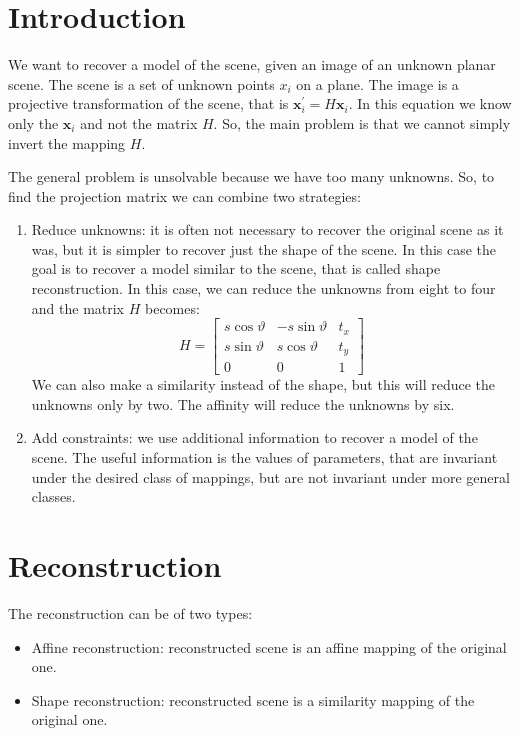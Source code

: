 \documentclass[12pt, a4paper]{report}
\newtheorem[style=M,bodystyle=\normalfont]{theorem}{Theorem}
\newtheorem[style=M,bodystyle=\normalfont]{corollary}{Corollary}
\newtheorem[style=M,bodystyle=\normalfont]{lemma}{Lemma}
\newtheorem[style=M,bodystyle=\normalfont]{definition}{Definition}
\begin{document}
    \section{Introduction}
    We want to recover a model of the scene, given an image of an unknown planar scene. The scene is a set of unknown points $x_i$ on  a 
    plane. The image is a projective transformation of the scene, that is $\boldsymbol{x}_i^{'}=H\boldsymbol{x}_i$. In this equation we
    know only the $\boldsymbol{x}_i$ and not the matrix $H$. So, the main problem is that we cannot simply invert the 
    mapping $H$. 

    The general problem is unsolvable because we have too many unknowns. So, to find the projection matrix we can combine two strategies: 
    \begin{enumerate}
        \item Reduce unknowns: it is often not necessary to recover the original scene as it was, but it is simpler to recover just 
            the shape of the scene. In this case the goal is to recover a model similar to the scene, that is called shape reconstruction. 
            In this case, we can reduce the unknowns from eight to four and the matrix $H$ becomes: 
            \[H=    
            \begin{bmatrix}
                s\cos \vartheta & -s\sin \vartheta & t_x \\
                s\sin \vartheta & s\cos \vartheta & t_y \\
                0 & 0 & 1
            \end{bmatrix}\]
            We can also make a similarity instead of the shape, but this will reduce the unknowns only by two. The affinity will reduce
            the unknowns by six. 
        \item Add constraints: we use additional information to recover a model of the scene. The useful information is the values of
            parameters, that are invariant under the desired class of mappings, but are not invariant under more general classes. 
    \end{enumerate}

    \section{Reconstruction}
    The reconstruction can be of two types: 
    \begin{itemize}
        \item Affine reconstruction: reconstructed scene is an affine mapping of the original one. 
        \item Shape reconstruction: reconstructed scene is a similarity mapping of the original one. 
    \end{itemize}
\end{document}
